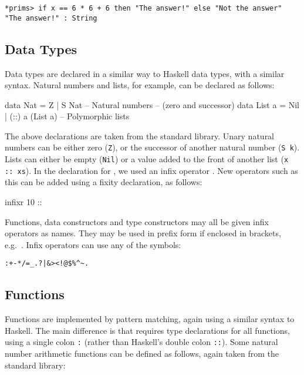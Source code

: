 \begin{lstlisting}[style=stdout]
*prims> if x == 6 * 6 + 6 then "The answer!" else "Not the answer"
"The answer!" : String
\end{lstlisting}

\subsection{Data Types}

Data types are declared in a similar way to Haskell data types, with a similar syntax.
Natural numbers and lists, for example, can be declared as follows:

\begin{code}
data Nat    = Z   | S Nat           -- Natural numbers
                                    -- (zero and successor)
data List a = Nil | (::) a (List a) -- Polymorphic lists
\end{code}

\noindent
The above declarations are taken from the standard library.
Unary natural numbers can be either zero (\texttt{Z}), or the successor of another natural number (\texttt{S k}).
Lists can either be empty (\texttt{Nil}) or a value added to the front of another list (\texttt{x :: xs}).
In the declaration for , we used an infix operator \tDC{::}.
New operators such as this can be added using a fixity declaration, as follows:

\begin{code}
infixr 10 ::
\end{code}

\noindent
Functions, data constructors and type constructors may all be given infix operators as names.
They may be used in prefix form if enclosed in brackets, e.g.\ \tDC{(::)}.
Infix operators can use any of the symbols:

\begin{lstlisting}[style=stdout]
:+-*/=_.?|&><!@$%^~.
\end{lstlisting}

\subsection{Functions}

Functions are implemented by pattern matching, again using a similar syntax to Haskell.
The main difference is that \Idris{} requires type declarations for all functions, using a single colon \texttt{:} (rather than Haskell's double colon \texttt{::}).
Some natural number arithmetic functions can be defined as follows, again taken from the standard library:

